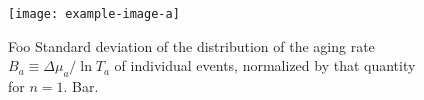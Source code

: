 \documentclass{article}
\begin{document}
\begin{figure}[htp]
    \subfloat{\label{fig:6a}}
    \subfloat{\label{fig:6b}}
    \centering
    \texttt{[image: example-image-a]}
    \protect\caption{
        Foo
        \protect{}
        Standard deviation of the distribution of the aging rate $B_a \equiv \Delta \mu_a / \ln T_a$ of individual events, normalized by that quantity for $n=1$.
        \protect{}
        Bar.
    }
    \label{fig:6}
\end{figure}
\end{document}
